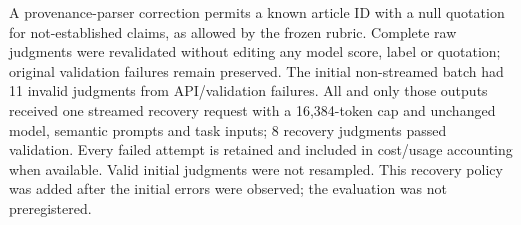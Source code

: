 A provenance-parser correction permits a known article ID with a null quotation for not-established claims, as allowed by the frozen rubric. Complete raw judgments were revalidated without editing any model score, label or quotation; original validation failures remain preserved.
The initial non-streamed batch had 11 invalid judgments from API/validation failures. All and only those outputs received one streamed recovery request with a 16,384-token cap and unchanged model, semantic prompts and task inputs; 8 recovery judgments passed validation. Every failed attempt is retained and included in cost/usage accounting when available. Valid initial judgments were not resampled. This recovery policy was added after the initial errors were observed; the evaluation was not preregistered.
